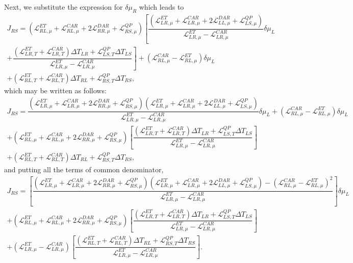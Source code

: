 Next, we substitute the expression for $\delta\mu_{R}$ which leads to
\begin{multline*}
J_{RS}=
(\mathcal{L}_{RL,\mu}^{ET}+\mathcal{L}_{RL,\mu}^{CAR}+2\mathcal{L}_{RR,\mu}^{DAR}+\mathcal{L}^{QP}_{RS,\mu})
\left[\dfrac{
(\mathcal{L}_{LR,\mu}^{ET}+\mathcal{L}_{LR,\mu}^{CAR}+2\mathcal{L}_{LL,\mu}^{DAR}+\mathcal{L}^{QP}_{LS,\mu})
}{\mathcal{L}_{LR,\mu}^{ET}-\mathcal{L}_{LR,\mu}^{CAR}}\delta\mu_{L}
\right.\\\left.+
\dfrac{
(\mathcal{L}_{LR,T}^{ET}+\mathcal{L}_{LR,T}^{CAR})\Delta T_{LR}
+
\mathcal{L}^{QP}_{LS,T}\Delta T_{LS}}{\mathcal{L}_{LR,\mu}^{ET}-\mathcal{L}_{LR,\mu}^{CAR}}\right]
+
(\mathcal{L}_{RL,\mu}^{CAR}-\mathcal{L}_{RL,\mu}^{ET})\delta\mu_{L}
\\+
(\mathcal{L}_{RL,T}^{ET}+\mathcal{L}_{RL,T}^{CAR})\Delta T_{RL}
+
\mathcal{L}^{QP}_{RS,T}\Delta T_{RS},
\end{multline*}
which may be written as follows:
\begin{multline*}
J_{RS}=
\dfrac{
    (\mathcal{L}_{LR,\mu}^{ET}+\mathcal{L}_{LR,\mu}^{CAR}+2\mathcal{L}_{RR,\mu}^{DAR}+\mathcal{L}^{QP}_{RS,\mu})
    (\mathcal{L}_{LR,\mu}^{ET}+\mathcal{L}_{LR,\mu}^{CAR}+2\mathcal{L}_{LL,\mu}^{DAR}+\mathcal{L}^{QP}_{LS,\mu})
}{\mathcal{L}_{LR,\mu}^{ET}-\mathcal{L}_{LR,\mu}^{CAR}}\delta\mu_{L}+
(\mathcal{L}_{RL,\mu}^{CAR}-\mathcal{L}_{RL,\mu}^{ET})\delta\mu_{L}
\\+
(\mathcal{L}_{RL,\mu}^{ET}+\mathcal{L}_{RL,\mu}^{CAR}+2\mathcal{L}_{RR,\mu}^{DAR}+\mathcal{L}^{QP}_{RS,\mu})
\left[\dfrac{
(\mathcal{L}_{LR,T}^{ET}+\mathcal{L}_{LR,T}^{CAR})\Delta T_{LR}
+
\mathcal{L}^{QP}_{LS,T}\Delta T_{LS}}{\mathcal{L}_{LR,\mu}^{ET}-\mathcal{L}_{LR,\mu}^{CAR}}\right]
\\+
(\mathcal{L}_{RL,T}^{ET}+\mathcal{L}_{RL,T}^{CAR})\Delta T_{RL}
+
\mathcal{L}^{QP}_{RS,T}\Delta T_{RS},
\end{multline*}
and putting all the terms of common denominator, 
\begin{multline}\label{JRSD1:intermed:eq1}
J_{RS}=\left[
\dfrac{
(\mathcal{L}_{LR,\mu}^{ET}+\mathcal{L}_{LR,\mu}^{CAR}+2\mathcal{L}_{RR,\mu}^{DAR}+\mathcal{L}^{QP}_{RS,\mu})
(\mathcal{L}_{LR,\mu}^{ET}+\mathcal{L}_{LR,\mu}^{CAR}+2\mathcal{L}_{LL,\mu}^{DAR}+\mathcal{L}^{QP}_{LS,\mu})
-(\mathcal{L}_{RL,\mu}^{CAR}-\mathcal{L}_{RL,\mu}^{ET})^{2}
}
{\mathcal{L}_{LR,\mu}^{ET}-\mathcal{L}_{LR,\mu}^{CAR}}\right]\delta\mu_{L}
\\+
(\mathcal{L}_{RL,\mu}^{ET}+\mathcal{L}_{RL,\mu}^{CAR}+2\mathcal{L}_{RR,\mu}^{DAR}+\mathcal{L}^{QP}_{RS,\mu})
\left[\dfrac{
(\mathcal{L}_{LR,T}^{ET}+\mathcal{L}_{LR,T}^{CAR})\Delta T_{LR}
+
\mathcal{L}^{QP}_{LS,T}\Delta T_{LS}}{\mathcal{L}_{LR,\mu}^{ET}-\mathcal{L}_{LR,\mu}^{CAR}}\right]
\\+
(\mathcal{L}_{LR,\mu}^{ET}-\mathcal{L}_{LR,\mu}^{CAR})\left[\dfrac{(\mathcal{L}_{RL,T}^{ET}+\mathcal{L}_{RL,T}^{CAR})\Delta T_{RL}
+
\mathcal{L}^{QP}_{RS,T}\Delta T_{RS}}{\mathcal{L}_{LR,\mu}^{ET}-\mathcal{L}_{LR,\mu}^{CAR}}\right].
\end{multline}

